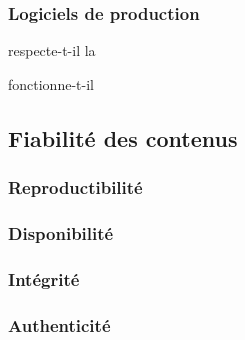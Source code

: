 \subsubsection{Logiciels de production}

\begin{itmz}
\item{respecte-t-il la }
\item{fonctionne-t-il }
\end{itmz}
\subsection{Fiabilité des contenus}

\subsubsection{Reproductibilité}

\subsubsection{Disponibilité}

\subsubsection{Intégrité}

\subsubsection{Authenticité}

\pagebreak

